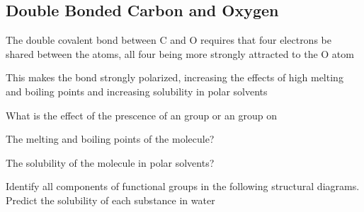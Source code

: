 \subsection{Double Bonded Carbon and Oxygen}
\begin{bulleted-list}
    \item The double covalent bond between C and O requires that four electrons be shared between
        the atoms, all four being more strongly attracted to the O atom
    \item This makes the  bond strongly polarized, increasing the effects of high melting
        and boiling points and increasing solubility in polar solvents
    \item What is the effect of the prescence of an  group or an  group on
        \begin{enum-alph}
            \item The melting and boiling points of the molecule?
            \item The solubility of the molecule in polar solvents?
        \end{enum-alph}
    \item Identify all components of functional groups in the following structural diagrams.
        Predict the solubility of each substance in water
        \begin{enum-alph}
            \item {}
            \item {}
            \item {}
            \item {}
        \end{enum-alph}
\end{bulleted-list}

